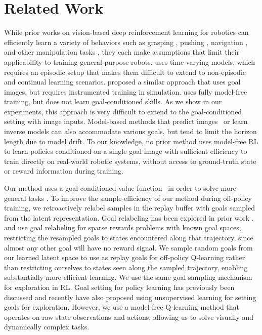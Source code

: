 \documentclass{article}
\begin{document}
\section{Related Work}
While prior works on vision-based deep reinforcement learning for robotics can efficiently learn a variety of behaviors such as grasping \citep{pinto2017asymmetric,pinto2015supersizing,levine2017grasping}, pushing \citep{agrawal2016poking,ebert2017videoprediction,finn2016visualforesight}, navigation \citep{pathak2018zeroshot, lange2012autonomous}, and other manipulation tasks \citep{lillicrap2015continuous, levine2016gps, pathak2018zeroshot}, they each make assumptions that limit their applicability to training general-purpose robots.
\citet{levine2016gps} uses time-varying models, which requires an episodic setup that makes them difficult to extend to non-episodic and continual learning scenarios.
\citet{pinto2017asymmetric} proposed a similar approach that uses goal images, but requires instrumented training in simulation. \citet{lillicrap2015continuous} uses fully model-free training, but does not learn goal-conditioned skills. As we show in our experiments, this approach is very difficult to extend to the goal-conditioned setting with image inputs.
Model-based methods that predict images~\citep{watter2015embed,finn2016visualforesight,ebert2017videoprediction,oh2015action} or learn inverse models \citep{agrawal2016poking} can also accommodate various goals, but tend to limit the horizon length due to model drift.
To our knowledge, no prior method uses model-free RL to learn policies conditioned on a single goal image with sufficient efficiency to train directly on real-world robotic systems, without access to ground-truth state or reward information during training.

Our method uses a goal-conditioned value function~\citep{schaul2015uva} in order to solve more general tasks \cite{sutton2011horde, kaelbling1993goals}. To improve the sample-efficiency of our method during off-policy training, we retroactively relabel samples in the replay buffer with goals sampled from the latent representation.
Goal relabeling has been explored in prior work \citep{kaelbling1993goals,andrychowicz2017her,rauber2017hindsight,levy2017hierarchical,pong2018tdm}. \citet{andrychowicz2017her} and \citet{levy2017hierarchical} use goal relabeling for sparse rewards problems with known goal spaces, restricting the resampled goals to states encountered along that trajectory, since almost any other goal will have no reward signal.
We sample random goals from our learned latent space to use as replay goals for off-policy Q-learning rather than restricting ourselves to states seen along the sampled trajectory, enabling substantially more efficient learning. We use the same goal sampling mechanism for exploration in RL. Goal setting for policy learning has previously been discussed \citep{baranes2012activeimgep} and recently \citet{pere2018unsupervisedgoalspaces} have also proposed using unsupervised learning for setting goals for exploration.
However, we use a model-free Q-learning method that operates on raw state observations and actions, allowing us to solve visually and dynamically complex tasks.
\end{document}
